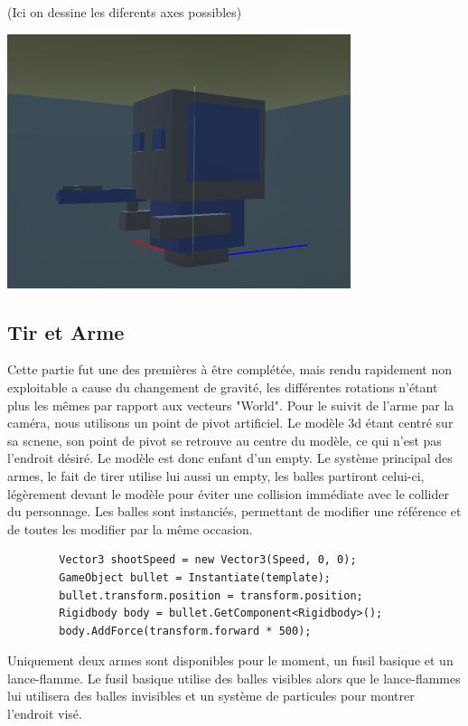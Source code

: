 ﻿\documentclass{article}
\begin{document}
(Ici on dessine les diferents axes possibles)

\centerline{\includegraphics[scale=1.0]{test_gravity.png}}


\subsection {Tir et Arme}

Cette partie fut une des premières à être complétée, mais rendu rapidement 
non exploitable a cause du changement de gravité, les différentes rotations 
n'étant plus les mêmes par rapport aux vecteurs "World".
Pour le suivit de l'arme par la caméra, nous utilisons un point de pivot 
artificiel. Le modèle 3d étant centré sur sa scnene, son point de pivot 
se retrouve au centre du modèle, ce qui n'est pas l'endroit désiré. Le 
modèle est donc enfant d'un empty. Le système principal des armes, le fait 
de tirer utilise lui aussi un empty, les balles partiront celui-ci, légèrement 
devant le modèle pour éviter une collision immédiate avec le collider du 
personnage. Les balles sont instanciés, permettant de modifier une référence 
et de toutes les modifier par la même occasion.

\begin{verbatim}
        Vector3 shootSpeed = new Vector3(Speed, 0, 0);
        GameObject bullet = Instantiate(template);
        bullet.transform.position = transform.position;
        Rigidbody body = bullet.GetComponent<Rigidbody>();
        body.AddForce(transform.forward * 500);
\end{verbatim}
		
Uniquement deux armes sont disponibles pour le moment, un fusil basique et un 
lance-flamme. Le fusil basique utilise des balles visibles alors que le lance-flammes 
lui utilisera des balles invisibles et un système de particules pour montrer l'endroit visé.
\end{document}
